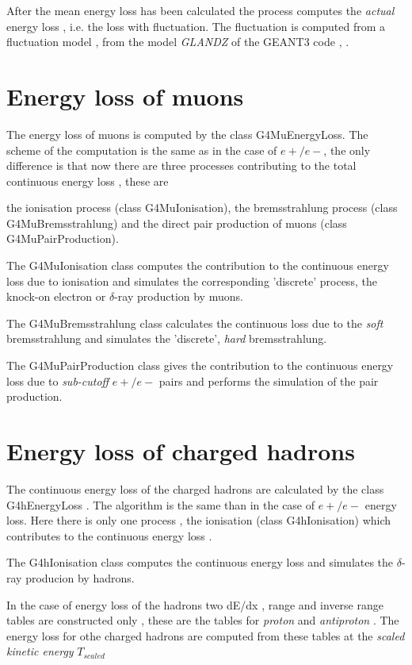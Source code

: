  After the mean energy loss has been calculated the process computes the
 {\em actual} energy loss , i.e. the loss with fluctuation. The fluctuation
 is computed from a fluctuation model , from the model {\em GLANDZ} of
 the GEANT3 code \cite{eloss.geant3} , \cite{eloss.kati} .

 \section{Energy loss of muons}

  The energy loss of muons is computed by the class G4MuEnergyLoss. The
 scheme of the computation is the same as in the case of \(e+/e-\),
 the only difference is that now there are three processes contributing
 to the total continuous energy loss , these are

   the ionisation process (class G4MuIonisation), 
   the bremsstrahlung process (class G4MuBremsstrahlung) and
   the direct pair production of muons (class G4MuPairProduction). 
  
  The G4MuIonisation class computes the contribution to the continuous energy
 loss due to ionisation and simulates the corresponding 'discrete' process,
 the knock-on electron or \(\delta\)-ray production by muons.

  The G4MuBremsstrahlung class calculates the continuous loss due to the 
 {\em soft} bremsstrahlung and simulates the 'discrete', {\em hard}
 bremsstrahlung.

  The G4MuPairProduction class gives the contribution to the continuous 
 energy loss due to {\em sub-cutoff} \(e+/e-\) pairs and performs the
 simulation of the pair production.

 \section{Energy loss of charged hadrons}

 The continuous energy loss of the charged hadrons are calculated by the class
 G4hEnergyLoss . The algorithm is the same than in the case of \(e+/e-\)
 energy loss. Here there is only one process , the ionisation (class G4hIonisation)
 which  contributes to the 
 continuous energy loss .

 The G4hIonisation class computes the continuous energy loss and simulates 
 the \(\delta\)-ray producion by hadrons.

  In the case of energy loss of the hadrons two dE/dx , range and inverse range
 tables are constructed only , these are the tables for {\em proton} and
 {\em antiproton} . The energy loss for othe charged hadrons are computed
 from these tables at the  {\em scaled kinetic energy} \(T_{scaled}\)

